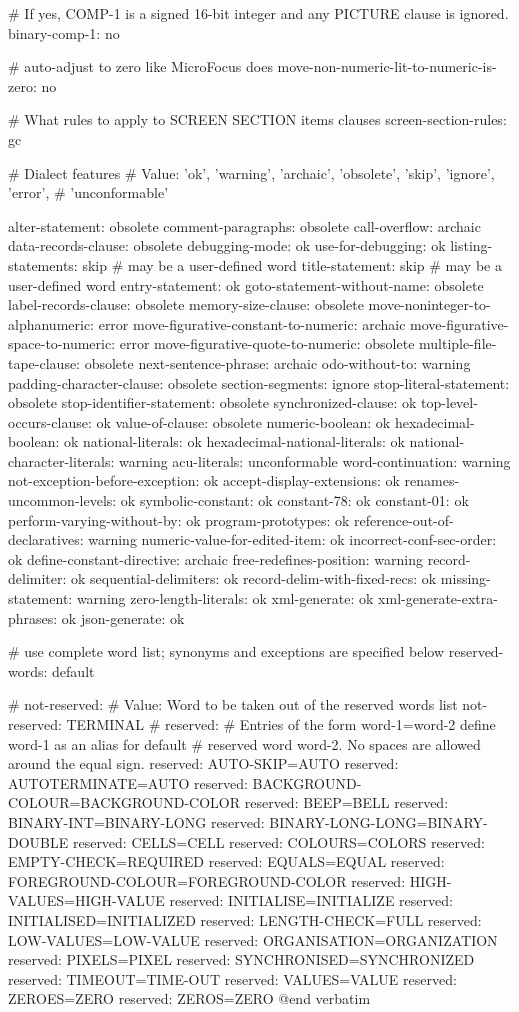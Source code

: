 # If yes, COMP-1 is a signed 16-bit integer and any PICTURE clause is ignored.
binary-comp-1:			no

# auto-adjust to zero like MicroFocus does
move-non-numeric-lit-to-numeric-is-zero: no

# What rules to apply to SCREEN SECTION items clauses
screen-section-rules:		gc

# Dialect features
# Value: 'ok', 'warning', 'archaic', 'obsolete', 'skip', 'ignore', 'error',
#        'unconformable'

alter-statement:			obsolete
comment-paragraphs:			obsolete
call-overflow:				archaic
data-records-clause:			obsolete
debugging-mode:				ok
use-for-debugging:			ok
listing-statements:			skip	# may be a user-defined word
title-statement:			skip	# may be a user-defined word
entry-statement:			ok
goto-statement-without-name:		obsolete
label-records-clause:			obsolete
memory-size-clause:			obsolete
move-noninteger-to-alphanumeric:	error
move-figurative-constant-to-numeric:	archaic
move-figurative-space-to-numeric:	error
move-figurative-quote-to-numeric:	obsolete
multiple-file-tape-clause:		obsolete
next-sentence-phrase:			archaic
odo-without-to:				warning
padding-character-clause:		obsolete
section-segments:			ignore
stop-literal-statement:			obsolete
stop-identifier-statement:		obsolete
synchronized-clause:			ok
top-level-occurs-clause:		ok
value-of-clause:			obsolete
numeric-boolean:			ok
hexadecimal-boolean:			ok
national-literals:			ok
hexadecimal-national-literals:		ok
national-character-literals:		warning
acu-literals:				unconformable
word-continuation:			warning
not-exception-before-exception:		ok
accept-display-extensions:		ok
renames-uncommon-levels:		ok
symbolic-constant:			ok
constant-78:				ok
constant-01:				ok
perform-varying-without-by:		ok
program-prototypes:			ok
reference-out-of-declaratives:		warning
numeric-value-for-edited-item:		ok
incorrect-conf-sec-order:		ok
define-constant-directive:		archaic
free-redefines-position:		warning
record-delimiter:			ok
sequential-delimiters:			ok
record-delim-with-fixed-recs:		ok
missing-statement:			warning
zero-length-literals:			ok
xml-generate:				ok
xml-generate-extra-phrases:		ok
json-generate:				ok

# use complete word list; synonyms and exceptions are specified below
reserved-words:		default

# not-reserved:
# Value: Word to be taken out of the reserved words list
not-reserved:	TERMINAL
# reserved:
#   Entries of the form word-1=word-2 define word-1 as an alias for default
# reserved word word-2. No spaces are allowed around the equal sign.
reserved:	AUTO-SKIP=AUTO
reserved:	AUTOTERMINATE=AUTO
reserved:	BACKGROUND-COLOUR=BACKGROUND-COLOR
reserved:	BEEP=BELL
reserved:	BINARY-INT=BINARY-LONG
reserved:	BINARY-LONG-LONG=BINARY-DOUBLE
reserved:	CELLS=CELL
reserved:	COLOURS=COLORS
reserved:	EMPTY-CHECK=REQUIRED
reserved:	EQUALS=EQUAL
reserved:	FOREGROUND-COLOUR=FOREGROUND-COLOR
reserved:	HIGH-VALUES=HIGH-VALUE
reserved:	INITIALISE=INITIALIZE
reserved:	INITIALISED=INITIALIZED
reserved:	LENGTH-CHECK=FULL
reserved:	LOW-VALUES=LOW-VALUE
reserved:	ORGANISATION=ORGANIZATION
reserved:	PIXELS=PIXEL
reserved:	SYNCHRONISED=SYNCHRONIZED
reserved:	TIMEOUT=TIME-OUT
reserved:	VALUES=VALUE
reserved:	ZEROES=ZERO
reserved:	ZEROS=ZERO
@end verbatim

